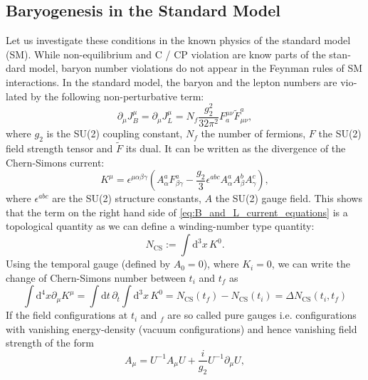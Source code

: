 \documentclass[master,       %
               twoside,        %
               BCOR10mm,       %
               english,ngerman, %
               ]{GAUBM}
\begin{document}
\begin{otherlanguage}{english}
\section{Baryogenesis in the Standard Model}
\label{sec:baryogenesis_in_the_standard_model}

Let us investigate these conditions in the known physics of the standard model (SM). While non-equilibrium and C / CP violation are know parts of the standard model, baryon number violations do not appear in the Feynman rules of SM interactions. In the standard model, the baryon and the lepton numbers are violated by the following non-perturbative term:
\begin{equation}
	\label{eq:B_and_L_current_equations}
	\partial_\mu J^\mu_B = \partial_\mu J^\mu_L = N_f \frac{g_2^2}{32 \pi^2} F^{\mu \nu}_a \tilde{F}_{\mu \nu}^a,
\end{equation}
where $g_2$ is the SU(2) coupling constant, $N_f$ the number of fermions, $F$ the SU(2) field strength tensor and $\tilde{F}$ its dual.
It can be written as the divergence of the Chern-Simons current:
\begin{equation}
	\label{eq:chern_simons_current}
	K^\mu = \epsilon^{\mu \alpha \beta \gamma} \left( A^a_\alpha F^a_{\beta \gamma} - \frac{g_2}{3} \epsilon^{abc} A^a_\alpha A^b_\beta A^c_\gamma \right),
\end{equation}
where $\epsilon^{abc}$ are the SU(2) structure constants, $A$ the SU(2) gauge field.
This shows that the term on the right hand side of \eqref{eq:B_and_L_current_equations} is a topological quantity as we can define a winding-number type quantity:
\begin{equation}
	N_{\mathrm{CS}} := \int \mathrm{d}^3 x \, K^0.
\end{equation}
Using the temporal gauge (defined by $A_0 = 0$), where $K_i = 0$,
we can write the change of Chern-Simons number between $t_i$ and $t_f$ as
\begin{equation}
	\int \mathrm{d}^4 x \partial_\mu K^\mu = \int \mathrm{d} t \, \partial_t \int \mathrm{d}^3 x \, K^0 =
	N_{\mathrm{CS}}(t_f) - N_{\mathrm{CS}}(t_i) = \Delta N_{\mathrm{CS}}(t_i, t_f)
\end{equation}
If the field configurations at $t_i$ and $_f$ are so called pure gauges i.e. configurations with vanishing energy-density (vacuum configurations) and hence vanishing field strength of the form
\begin{equation}
	A_\mu = U^{-1} A_\mu U + \frac{i}{g_2} U^{-1} \partial_\mu U,
\end{equation}

\end{otherlanguage}
\end{document}
